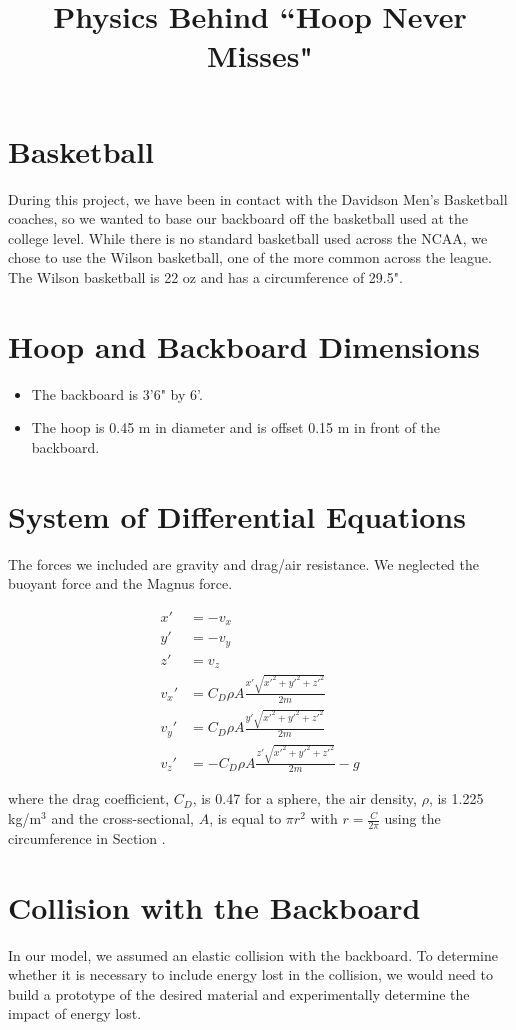 \documentclass[aps,draft,12pt]{revtex4}
\newcommand{\RomanNumeralCaps}[1]
    {\MakeUppercase{\romannumeral #1}}
\begin{document}
\title{Physics Behind ``Hoop Never Misses"}
\maketitle

\section{Basketball}
During this project, we have been in contact with the Davidson Men's Basketball coaches, so we wanted to base our backboard off the basketball used at the college level. While there is no standard basketball used across the NCAA, we chose to use the Wilson basketball, one of the more common across the league. The Wilson basketball is 22 oz and has a circumference of 29.5".

\section{Hoop and Backboard Dimensions}
\begin{itemize}
\item
The backboard is 3'6" by 6'.
\item
The hoop is 0.45 m in diameter and is offset 0.15 m in front of the backboard.
\end{itemize}

\section{System of Differential Equations}
The forces we included are gravity and drag/air resistance. We neglected the buoyant force and the Magnus force.

\begin{align}
x' &= -v_x \\
y' &= -v_y \\
z' &= v_z \\
v_x' &= C_D\rho A\frac{x'\sqrt{x'^2+y'^2+z'^2}}{2m} \\
v_y' &= C_D\rho A\frac{y'\sqrt{x'^2+y'^2+z'^2}}{2m} \\
v_z' &= -C_D\rho A\frac{z'\sqrt{x'^2+y'^2+z'^2}}{2m}-g
\end{align}

where the drag coefficient, $C_D$, is 0.47 for a sphere, the air density, $\rho$, is 1.225 kg/m$^3$ and the cross-sectional, $A$, is equal to $\pi r^2$ with $r=\frac{C}{2\pi}$ using the circumference in Section \RomanNumeralCaps{1}.

\section{Collision with the Backboard}
In our model, we assumed an elastic collision with the backboard. To determine whether it is necessary to include energy lost in the collision, we would need to build a prototype of the desired material and experimentally determine the impact of energy lost.
\end{document}
